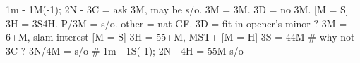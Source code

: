1m - 1M(-1); 2N -
3C = ask 3M, may be s/o.
    3M = 3M. 3D = no 3M. [M = S] 3H = 3S4H.
        P/3M = s/o. other = nat GF.
3D = fit in opener's minor ?
3M = 6+M, slam interest
[M = S] 3H = 55+M, MST+
[M = H] 3S = 44M  # why not 3C ?
3N/4M = s/o  # 1m - 1S(-1); 2N - 4H = 55M s/o